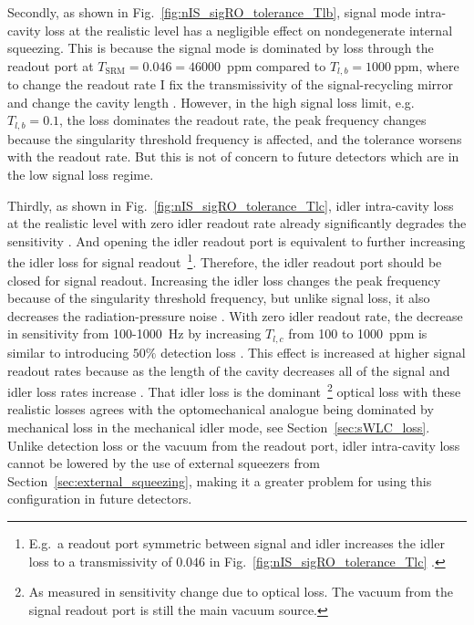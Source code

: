 Secondly, as shown in Fig.~\ref{fig:nIS_sigRO_tolerance_Tlb}, signal mode intra-cavity loss at the realistic level has a negligible  effect on nondegenerate internal squeezing. This is because the signal mode is dominated by loss through the readout port at $T_\text{SRM}=0.046=46000$~ppm compared to $T_{l,b}=1000~\text{ppm}$, where to change the readout rate I fix the transmissivity of the signal-recycling mirror and change the cavity length . However, in the high signal loss limit, e.g.\ $T_{l,b}=0.1$, the loss dominates the readout rate, the peak frequency changes because the singularity threshold frequency is affected, and the tolerance worsens with the readout rate.  %
But this is not of concern to future detectors which are in the low signal loss regime.

Thirdly, as shown in Fig.~\ref{fig:nIS_sigRO_tolerance_Tlc}, idler intra-cavity loss at the realistic level with zero idler readout rate already significantly degrades the sensitivity . And opening the idler readout port is equivalent to further increasing the idler loss for signal readout~\footnote{E.g.\ a readout port symmetric between signal and idler increases the idler loss to a transmissivity of $0.046$ in Fig.~\ref{fig:nIS_sigRO_tolerance_Tlc} .}. Therefore, the idler readout port should be closed for signal readout. Increasing the idler loss changes the peak frequency because of the singularity threshold frequency, but unlike signal loss, it also decreases the radiation-pressure noise . With zero idler readout rate, the decrease in sensitivity from 100-1000~Hz by increasing $T_{l,c}$ from 100 to 1000~ppm is similar to introducing $50\%$ detection loss . This effect is increased at higher signal readout rates because as the length of the cavity decreases all of the signal and idler loss rates increase . 
That idler loss is the dominant~\footnote{As measured in sensitivity change due to optical loss. The vacuum from the signal readout port is still the main vacuum source.} optical loss with these realistic losses  agrees with the optomechanical analogue being dominated by mechanical loss in the mechanical idler mode, see Section~\ref{sec:sWLC_loss}. Unlike detection loss or the vacuum from the readout port, idler intra-cavity loss cannot be lowered by the use of external squeezers from Section~\ref{sec:external_squeezing}, making it a greater problem for using this configuration in future detectors.

